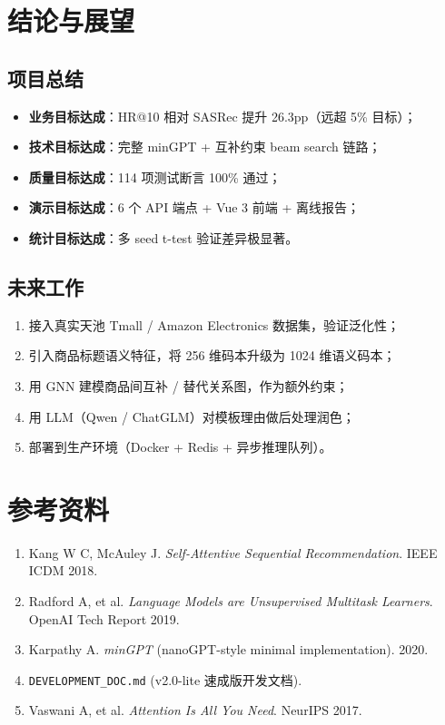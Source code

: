 \documentclass[12pt,a4paper]{article}
\begin{document}
\section{结论与展望}

\subsection{项目总结}
\begin{itemize}[leftmargin=2em]
    \item \textbf{业务目标达成}：HR@10 相对 SASRec 提升 26.3pp（远超 5\% 目标）；
    \item \textbf{技术目标达成}：完整 minGPT + 互补约束 beam search 链路；
    \item \textbf{质量目标达成}：114 项测试断言 100\% 通过；
    \item \textbf{演示目标达成}：6 个 API 端点 + Vue 3 前端 + 离线报告；
    \item \textbf{统计目标达成}：多 seed t-test 验证差异极显著。
\end{itemize}

\subsection{未来工作}
\begin{enumerate}[leftmargin=2em]
    \item 接入真实天池 Tmall / Amazon Electronics 数据集，验证泛化性；
    \item 引入商品标题语义特征，将 256 维码本升级为 1024 维语义码本；
    \item 用 GNN 建模商品间互补 / 替代关系图，作为额外约束；
    \item 用 LLM（Qwen / ChatGLM）对模板理由做后处理润色；
    \item 部署到生产环境（Docker + Redis + 异步推理队列）。
\end{enumerate}

\section{参考资料}

\begin{enumerate}[leftmargin=2em]
    \item Kang W C, McAuley J. \textit{Self-Attentive Sequential Recommendation}.
          IEEE ICDM 2018.
    \item Radford A, et al. \textit{Language Models are Unsupervised Multitask Learners}.
          OpenAI Tech Report 2019.
    \item Karpathy A. \textit{minGPT} (nanoGPT-style minimal implementation). 2020.
    \item \texttt{DEVELOPMENT\_DOC.md} (v2.0-lite 速成版开发文档).
    \item Vaswani A, et al. \textit{Attention Is All You Need}. NeurIPS 2017.
\end{enumerate}
\end{document}
